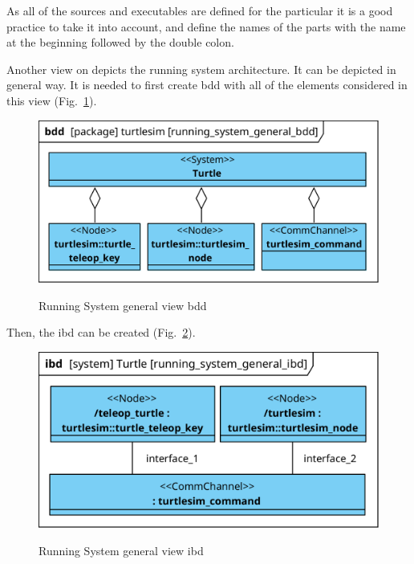 \documentclass[11pt,oneside,a4paper]{report}
\begin{document}
As all of the sources and executables are defined for the particular \stPackage{} it is a good practice to take it into account, and define the names of the \stPackage{} parts with the \stPackage{} name at the beginning followed by the double colon. 

Another view on \stSystem{} depicts the running system architecture. It can be depicted in general way. It is needed to first create bdd with all of the elements considered in this view (Fig.~\ref{fig:running_system_general_bdd}).
			
\begin{figure}[H]
	\centering
	\begin{center}
		{\includegraphics[scale=1.0]{diagrams/running_system_general_bdd.png}}
	\end{center}
	\caption{Running System general view bdd}
	\label{fig:running_system_general_bdd}
\end{figure}

\pagebreak

Then, the ibd can be created (Fig.~\ref{fig:running_system_general_ibd}). 

\begin{figure}[H]
	\centering
	\begin{center}
		{\includegraphics[scale=1.0]{diagrams/running_system_general_ibd.png}}
	\end{center}
	\caption{Running System general view ibd}
	\label{fig:running_system_general_ibd}
\end{figure}
\end{document}
